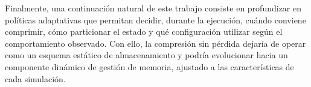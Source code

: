 Finalmente, una continuación natural de este trabajo consiste en 
profundizar en políticas adaptativas que permitan decidir, 
durante la ejecución, cuándo conviene comprimir, cómo particionar 
el estado y qué configuración utilizar según el comportamiento observado. 
Con ello, la compresión sin pérdida dejaría de operar como un esquema 
estático de almacenamiento y podría evolucionar hacia un componente 
dinámico de gestión de memoria, ajustado a las características de cada simulación.

